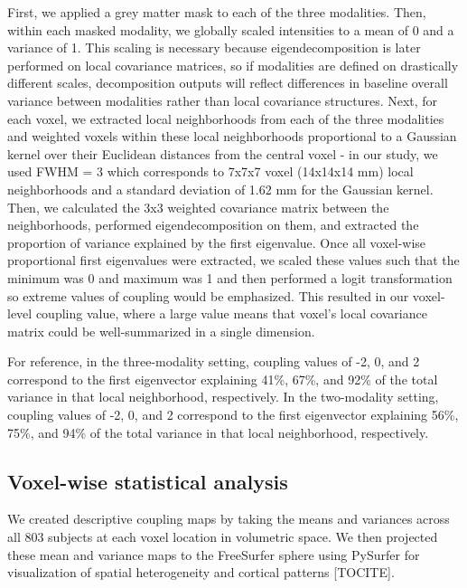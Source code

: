 \documentclass[
  12pt,
]{article}
\begin{document}
First, we applied a grey matter mask to each of the three modalities. Then, within each masked modality, we globally scaled intensities to a mean of 0 and a variance of 1. This scaling is necessary because eigendecomposition is later performed on local covariance matrices, so if modalities are defined on drastically different scales, decomposition outputs will reflect differences in baseline overall variance between modalities rather than local covariance structures. Next, for each voxel, we extracted local neighborhoods from each of the three modalities and weighted voxels within these local neighborhoods proportional to a Gaussian kernel over their Euclidean distances from the central voxel - in our study, we used FWHM = 3 which corresponds to 7x7x7 voxel (14x14x14 mm) local neighborhoods and a standard deviation of 1.62 mm for the Gaussian kernel. Then, we calculated the 3x3 weighted covariance matrix between the neighborhoods, performed eigendecomposition on them, and extracted the proportion of variance explained by the first eigenvalue. Once all voxel-wise proportional first eigenvalues were extracted, we scaled these values such that the minimum was 0 and maximum was 1 and then performed a logit transformation so extreme values of coupling would be emphasized. This resulted in our voxel-level coupling value, where a large value means that voxel's local covariance matrix could be well-summarized in a single dimension.

For reference, in the three-modality setting, coupling values of -2, 0, and 2 correspond to the first eigenvector explaining 41\%, 67\%, and 92\% of the total variance in that local neighborhood, respectively. In the two-modality setting, coupling values of -2, 0, and 2 correspond to the first eigenvector explaining 56\%, 75\%, and 94\% of the total variance in that local neighborhood, respectively.

\hypertarget{voxel-wise-statistical-analysis}{%
\subsection{Voxel-wise statistical analysis}\label{voxel-wise-statistical-analysis}}

We created descriptive coupling maps by taking the means and variances across all 803 subjects at each voxel location in volumetric space. We then projected these mean and variance maps to the FreeSurfer sphere using PySurfer for visualization of spatial heterogeneity and cortical patterns {[}TOCITE{]}.
\end{document}
